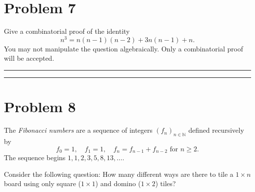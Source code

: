 \documentclass{article}
\theoremstyle{definition}
\newenvironment{solution}{\bigskip\hrule{\hfill}}{\bigskip\hrule{\hfill}} %
\begin{document}

\newpage


\section*{Problem 7}
Give a combinatorial proof of the identity $$n^3=n\left(n-1\right)\left(n-2\right)+3n\left(n-1\right)+n.$$ You may not manipulate the question algebraically. Only a combinatorial proof will be accepted.
\begin{solution}


\end{solution}


\newpage


\section*{Problem 8}
The \emph{Fibonacci numbers} are a sequence of integers $\left(f_n\right)_{n\in\mathbb{N}}$ defined recursively by $$f_0=1,\quad f_1=1, \quad f_n=f_{n-1}+f_{n-2}\text{ for }n\geq2.$$ The sequence begins $1,1,2,3,5,8,13,\dots$. \bigskip

\noindent Consider the following question: How many different ways are there to tile a $1\times n$ board using only square ($1\times 1$) and domino ($1\times 2$) tiles?
\begin{center}
\end{center}
\end{document}
